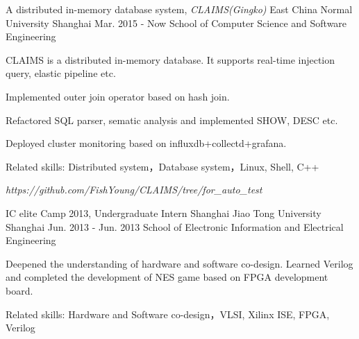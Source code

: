 \begin{cventries}
  \cventry
    {A distributed in-memory database system, \it{CLAIMS(Gingko)} }
    {East China Normal University}
    {Shanghai}
    {Mar. 2015 - Now}
    {School of Computer Science and Software Engineering}
    {
      \begin{cvitems}
	\item {CLAIMS is a distributed in-memory database. It supports real-time injection query, elastic pipeline etc.}
	\item {Implemented outer join operator based on hash join.}
	\item {Refactored SQL parser, sematic analysis and implemented SHOW, DESC etc.}
	\item {Deployed cluster monitoring based on influxdb+collectd+grafana.}
	\item {Related skills: Distributed system，Database system，Linux, Shell, C++}
	\item[] {\color{red} \emph {https://github.com/FishYoung/CLAIMS/tree/for\_auto\_test}}
      \end{cvitems}
    }
  \cventry
    {IC elite Camp 2013, Undergraduate Intern }
    {Shanghai Jiao Tong University}
    {Shanghai}
    {Jun. 2013 - Jun. 2013}
    {School of Electronic Information and Electrical Engineering}
    {
      \begin{cvitems}
        \item {Deepened the understanding of hardware and software co-design. Learned Verilog and completed the development of NES game based on FPGA development board.}
        \item {Related skills: Hardware and Software co-design，VLSI, Xilinx ISE, FPGA, Verilog}
      \end{cvitems}
    }
\end{cventries}
